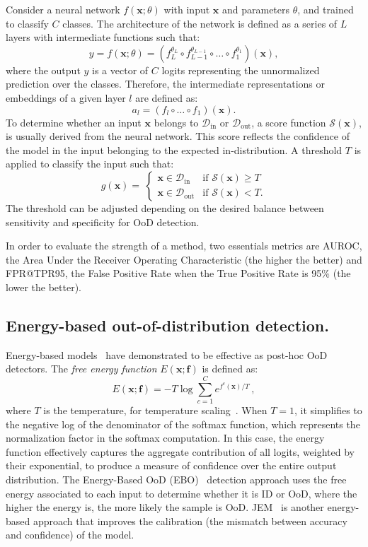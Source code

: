 \documentclass[10pt,twocolumn,a4paper]{article}
\newcommand{\minisection}[1]{\vspace{0.03in} \noindent {\bf #1}}
\def\rvx{{\mathbf{x}}}
\begin{document}
\minisection{Terminology.}
Consider a neural network $f(\rvx;\theta)$ with input $\rvx$ and parameters $\theta$, and trained to classify $C$ classes. The architecture of the network is defined as a series of $L$ layers with intermediate functions such that:
\[
y = f(\rvx;\theta) = (f^{\theta_{L}}_{L} \circ f^{\theta_{L-1}}_{L-1} \circ \dots \circ f^{\theta_{1}}_{1})(\rvx),
\]
\noindent where the output $y$ is a vector of $C$ logits representing the unnormalized prediction over the classes. Therefore, the intermediate representations or embeddings of a given layer $l$ are defined as:
\[
a_{l} = (f_{l} \circ \dots \circ f_{1})(\rvx).
\]
To determine whether an input $\rvx$ belongs to $\mathcal{D}_{\text{in}}$ or $\mathcal{D}_{\text{out}}$, a score function $\mathcal{S}(\rvx)$, is usually derived from the neural network. This score reflects the confidence of the model in the input belonging to the expected in-distribution. A threshold $T$ is applied to classify the input such that: 
\[
g(\rvx) = \ \left\{
\begin{array}{ll}
\rvx\in\mathcal{D}_{\text{in}} & \text{if } \mathcal{S}(\rvx) \geq T \\
\rvx\in\mathcal{D}_{\text{out}} & \text{if } \mathcal{S}(\rvx) < T.
\end{array}
\right.
\]
The threshold can be adjusted depending on the desired balance between sensitivity and specificity for OoD detection. 

\minisection{Metrics.} In order to evaluate the strength of a method, two essentials metrics are \mbox{AUROC}, the Area Under the Receiver Operating Characteristic (the higher the better) and \mbox{FPR@TPR95}, the False Positive Rate when the True Positive Rate is 95\% (the lower the better).

\subsection{Energy-based out-of-distribution detection.}
Energy-based models~\cite{lecun2006tutorial} have demonstrated to be effective as post-hoc OoD detectors. The \textit{free energy function} $E(\rvx; \mathbf{f})$ is defined as:
\begin{equation}\label{eq:1}
    E(\rvx; \mathbf{f}) = -T \log \sum_{c=1}^{C} e^{f^{c}(\rvx)/T} \,,
\end{equation}
where $T$ is the temperature, for temperature scaling~\cite{guo2017calibration}. When $T\!=\!1$, it simplifies to the negative log of the denominator of the softmax function, which represents the normalization factor in the softmax computation. In this case, the energy function effectively captures the aggregate contribution of all logits, weighted by their exponential, to produce a measure of confidence over the entire output distribution.  The Energy-Based OoD (EBO)~\cite{liu2020energy} detection approach uses the free energy associated to each input to determine whether it is ID or OoD, where the higher the energy is, the more likely the sample is OoD. JEM~\cite{grathwohl2020jem} is another energy-based approach that improves the calibration (the mismatch between accuracy and confidence) of the model.
\end{document}
